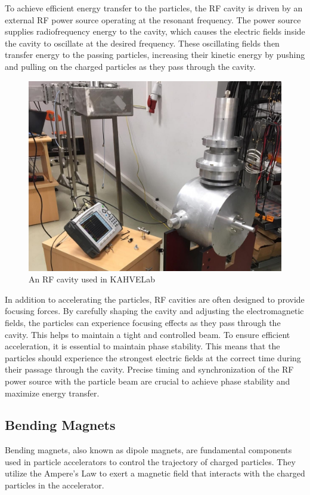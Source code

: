 \documentclass{article}
\begin{document}
To achieve efficient energy transfer to the particles, the RF cavity is driven by an external RF power source operating at the resonant frequency. 
The power source supplies radiofrequency energy to the cavity, which causes the electric fields inside the cavity to oscillate at the desired frequency. 
These oscillating fields then transfer energy to the passing particles, increasing their kinetic energy by pushing and pulling on the charged particles as they pass through the cavity. 
\newline

\begin{figure}[H]
    \centering
    \includegraphics[width=.75\textwidth]{../../../figures/pill_box.jpeg}
    \caption{An RF cavity used in KAHVELab}
\end{figure}

In addition to accelerating the particles, RF cavities are often designed to provide focusing forces. 
By carefully shaping the cavity and adjusting the electromagnetic fields, the particles can experience focusing effects as they pass through the cavity. 
This helps to maintain a tight and controlled beam. To ensure efficient acceleration, it is essential to maintain phase stability. 
This means that the particles should experience the strongest electric fields at the correct time during their passage through the cavity. 
Precise timing and synchronization of the RF power source with the particle beam are crucial to achieve phase stability and maximize energy transfer.

\subsection{Bending Magnets}
Bending magnets, also known as dipole magnets, are fundamental components used in particle accelerators to control the trajectory of charged particles. 
They utilize the Ampere's Law to exert a magnetic field that interacts with the charged particles in the accelerator. 
\end{document}
